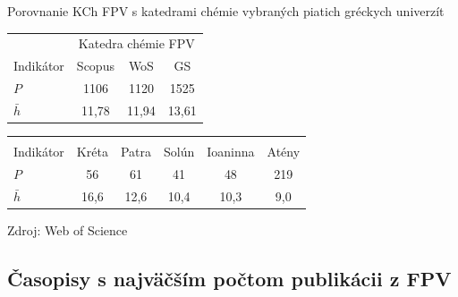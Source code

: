 \documentclass{beamer}
\begin{document}
%
%
\begin{frame}{Porovnanie KCh FPV s katedrami chémie vybraných piatich gréckych univerzít}
  \begin{table}
    \footnotesize
    \begin{tabular}{lccc}
    \toprule
    & \multicolumn{3}{c}{Katedra chémie FPV} \\
    \cmidrule{2-4}
    Indikátor & Scopus & WoS & GS \\
    \midrule
    $P$        & 1106   & 1120  & 1525  \\
    $\bar{h}$  & 11,78  & 11,94 & 13,61 \\
    \bottomrule
    \end{tabular}
  \end{table}
  \begin{table}
    \footnotesize
    \begin{tabular}{lccccc}
    \toprule
    & \multicolumn{5}{c}{\citet{Lazaridis2010}} \\
    \cmidrule{2-6}
    Indikátor & Kréta & Patra & Solún & Ioaninna & Atény \\
    \midrule
    $P$        & 56    & 61    & 41    & 48       & 219   \\
    $\bar{h}$  & 16,6  & 12,6  & 10,4  & 10,3     & 9,0   \\
    \bottomrule
    \end{tabular}
  \end{table}
\parbox{\textwidth}{\centering\tiny Zdroj: Web of Science}
\end{frame}

\subsection{Časopisy s najväčším počtom publikácii z FPV}
\end{document}
